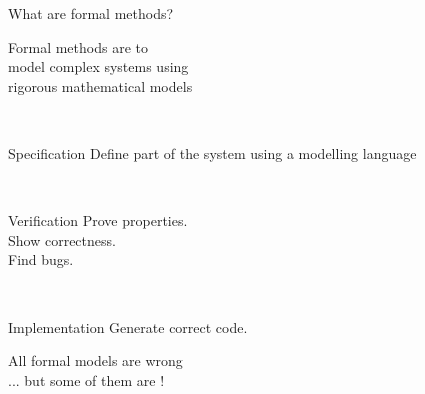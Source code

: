 \documentclass[aspectratio=169]{beamer}
\begin{document}
\begin{slide}{What are formal methods?}
  \centering

  \begin{minipage}{0.7\textwidth}
  \Large
  \begin{block}{}
    \centering
    Formal methods are  to
    \\
    model \alert{complex systems} using
    \\
    \alert{rigorous mathematical models}

  \end{block}
  \end{minipage}
  \\[10mm]

  \begin{minipage}{0.32\textwidth}
  \begin{alertblock}{Specification}
    Define part of the system using a modelling language
  \end{alertblock}
  \end{minipage}
~~
  \begin{minipage}{0.3\textwidth}
  \begin{alertblock}{Verification}
    Prove properties.\\Show correctness.\\Find bugs.
  \end{alertblock}
  \end{minipage}
~~
  \begin{minipage}{0.28\textwidth}
  \begin{exampleblock}{Implementation}
    Generate correct code.\\
  \end{exampleblock}
  \end{minipage}

\end{slide}

\begin{frame}
  \huge\centering
  All formal models are \alert{wrong}
  \pause
  \\[5mm]
  ... but some of them are !
\end{frame}



\end{document}
